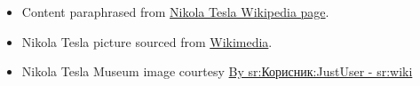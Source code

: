 \documentclass[
]{article}
\providecommand{\tightlist}{%
  \setlength{\itemsep}{0pt}\setlength{\parskip}{0pt}}
\begin{document}
\begin{itemize}
\tightlist
\item
  Content paraphrased from
  \href{https://en.wikipedia.org/wiki/Nikola_Tesla}{Nikola Tesla
  Wikipedia page}.\\
\item
  Nikola Tesla picture sourced from
  \href{https://commons.wikimedia.org/wiki/File:N.Tesla.JPG}{Wikimedia}.\\
\item
  Nikola Tesla Museum image courtesy
  \href{https://commons.wikimedia.org/w/index.php?curid=3090675}{By
  sr:Корисник:JustUser - sr:wiki}
\end{itemize}
\end{document}
